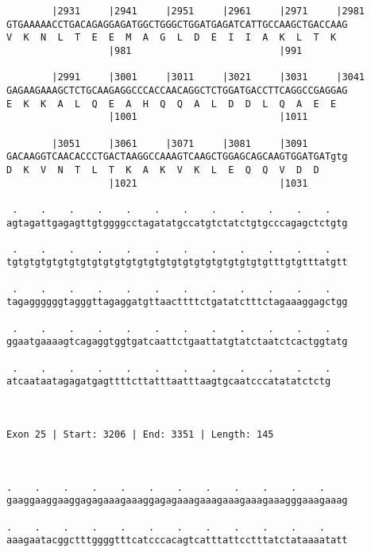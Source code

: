 \documentclass{article}
\begin{document}
\begin{Verbatim}
        |2931     |2941     |2951     |2961     |2971     |2981
GTGAAAAACCTGACAGAGGAGATGGCTGGGCTGGATGAGATCATTGCCAAGCTGACCAAG
V  K  N  L  T  E  E  M  A  G  L  D  E  I  I  A  K  L  T  K  
                  |981                          |991        
  
        |2991     |3001     |3011     |3021     |3031     |3041
GAGAAGAAAGCTCTGCAAGAGGCCCACCAACAGGCTCTGGATGACCTTCAGGCCGAGGAG
E  K  K  A  L  Q  E  A  H  Q  Q  A  L  D  D  L  Q  A  E  E  
                  |1001                         |1011       
  
        |3051     |3061     |3071     |3081     |3091       
GACAAGGTCAACACCCTGACTAAGGCCAAAGTCAAGCTGGAGCAGCAAGTGGATGATgtg
D  K  V  N  T  L  T  K  A  K  V  K  L  E  Q  Q  V  D  D     
                  |1021                         |1031       
  
 .    .    .    .    .    .    .    .    .    .    .    .   
agtagattgagagttgtggggcctagatatgccatgtctatctgtgcccagagctctgtg
                                                            
 .    .    .    .    .    .    .    .    .    .    .    .   
tgtgtgtgtgtgtgtgtgtgtgtgtgtgtgtgtgtgtgtgtgtgtgtttgtgtttatgtt
                                                            
 .    .    .    .    .    .    .    .    .    .    .    .   
tagaggggggtagggttagaggatgttaacttttctgatatctttctagaaaggagctgg
                                                            
 .    .    .    .    .    .    .    .    .    .    .    .   
ggaatgaaaagtcagaggtggtgatcaattctgaattatgtatctaatctcactggtatg
                                                            
 .    .    .    .    .    .    .    .    .    .    .    .
atcaataatagagatgagttttcttatttaatttaagtgcaatcccatatatctctg
                                                         
                                                         
 
Exon 25 | Start: 3206 | End: 3351 | Length: 145



.    .    .    .    .    .    .    .    .    .    .    .    
gaaggaaggaaggagagaaagaaaggagagaaagaaagaaagaaagaaagggaaagaaag
                                                            
.    .    .    .    .    .    .    .    .    .    .    .    
aaagaatacggctttggggtttcatcccacagtcatttattcctttatctataaaatatt
                                                            

\end{Verbatim}
\end{document}
